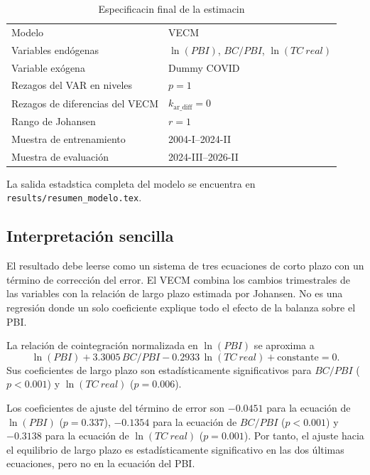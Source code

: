 \documentclass[12pt,a4paper]{article}
\begin{document}
\begin{table}[H]
\centering
\caption{Especificacin final de la estimacin}
\begin{tabular}{ll}
\toprule
Modelo & VECM \\
Variables endógenas & $\ln(PBI)$, $BC/PBI$, $\ln(TC\ real)$ \\
Variable exógena & Dummy COVID \\
Rezagos del VAR en niveles & $p=1$ \\
Rezagos de diferencias del VECM & $k_{\mathrm{ar\_diff}}=0$ \\
Rango de Johansen & $r=1$ \\
Muestra de entrenamiento & 2004-I--2024-II \\
Muestra de evaluación & 2024-III--2026-II \\
\bottomrule
\end{tabular}
\end{table}

La salida estadstica completa del modelo se encuentra en
\texttt{results/resumen\_modelo.tex}.

\begin{center}
\small

\normalsize
\end{center}

\subsection{Interpretación sencilla}

El resultado debe leerse como un sistema de tres ecuaciones de corto plazo
con un término de corrección del error. El VECM combina los cambios
trimestrales de las variables con la relación de largo plazo estimada por
Johansen. No es una regresión donde un solo coeficiente explique todo el
efecto de la balanza sobre el PBI.

La relación de cointegración normalizada en $\ln(PBI)$ se aproxima a
\[
\ln(PBI)+3.3005\,BC/PBI-0.2933\,\ln(TC\ real)+\text{constante}=0.
\]
Sus coeficientes de largo plazo son estadísticamente significativos para
$BC/PBI$ ($p<0.001$) y $\ln(TC\ real)$ ($p=0.006$).

Los coeficientes de ajuste del término de error son $-0.0451$ para la
ecuación de $\ln(PBI)$ ($p=0.337$), $-0.1354$ para la ecuación de $BC/PBI$
($p<0.001$) y $-0.3138$ para la ecuación de $\ln(TC\ real)$ ($p=0.001$).
Por tanto, el ajuste hacia el equilibrio de largo plazo es estadísticamente
significativo en las dos últimas ecuaciones, pero no en la ecuación del PBI.
\end{document}
